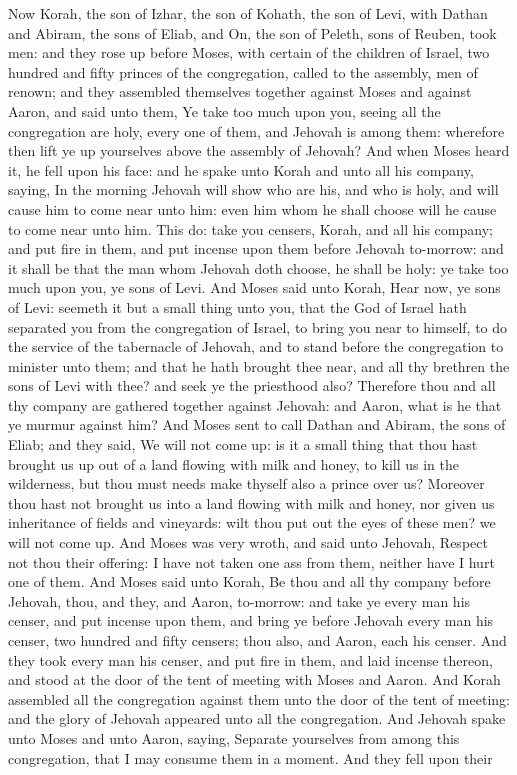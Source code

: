 Now Korah, the son of Izhar, the son of Kohath, the son of Levi, with Dathan and Abiram, the sons of Eliab, and On, the son of Peleth, sons of Reuben, took men: and they rose up before Moses, with certain of the children of Israel, two hundred and fifty princes of the congregation, called to the assembly, men of renown; and they assembled themselves together against Moses and against Aaron, and said unto them, Ye take too much upon you, seeing all the congregation are holy, every one of them, and Jehovah is among them: wherefore then lift ye up yourselves above the assembly of Jehovah?  And when Moses heard it, he fell upon his face: and he spake unto Korah and unto all his company, saying, In the morning Jehovah will show who are his, and who is holy, and will cause him to come near unto him: even him whom he shall choose will he cause to come near unto him. This do: take you censers, Korah, and all his company; and put fire in them, and put incense upon them before Jehovah to-morrow: and it shall be that the man whom Jehovah doth choose, he shall be holy: ye take too much upon you, ye sons of Levi. And Moses said unto Korah, Hear now, ye sons of Levi: seemeth it but a small thing unto you, that the God of Israel hath separated you from the congregation of Israel, to bring you near to himself, to do the service of the tabernacle of Jehovah, and to stand before the congregation to minister unto them; and that he hath brought thee near, and all thy brethren the sons of Levi with thee? and seek ye the priesthood also? Therefore thou and all thy company are gathered together against Jehovah: and Aaron, what is he that ye murmur against him?  And Moses sent to call Dathan and Abiram, the sons of Eliab; and they said, We will not come up: is it a small thing that thou hast brought us up out of a land flowing with milk and honey, to kill us in the wilderness, but thou must needs make thyself also a prince over us? Moreover thou hast not brought us into a land flowing with milk and honey, nor given us inheritance of fields and vineyards: wilt thou put out the eyes of these men? we will not come up.  And Moses was very wroth, and said unto Jehovah, Respect not thou their offering: I have not taken one ass from them, neither have I hurt one of them. And Moses said unto Korah, Be thou and all thy company before Jehovah, thou, and they, and Aaron, to-morrow: and take ye every man his censer, and put incense upon them, and bring ye before Jehovah every man his censer, two hundred and fifty censers; thou also, and Aaron, each his censer. And they took every man his censer, and put fire in them, and laid incense thereon, and stood at the door of the tent of meeting with Moses and Aaron. And Korah assembled all the congregation against them unto the door of the tent of meeting: and the glory of Jehovah appeared unto all the congregation.  And Jehovah spake unto Moses and unto Aaron, saying, Separate yourselves from among this congregation, that I may consume them in a moment. And they fell upon their 